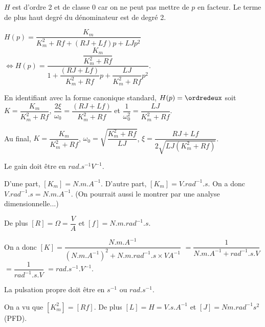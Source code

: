 \else
\fi

\ifprof
$H$ est d'ordre 2 et de classe 0 car on ne peut pas mettre de $p$ en facteur. Le terme de plus haut degré du dénominateur est de degré 2. 
\else
\fi

\ifprof
$H(p)=\dfrac{K_m}{K_m^2+ Rf +\left(RJ  + Lf\right) p + LJp^2 } $
$\Leftrightarrow H(p)=\dfrac{\dfrac{K_m}{K_m^2+ Rf}}{1 +\dfrac{\left(RJ  + Lf\right)}{K_m^2+ Rf} p + \dfrac{LJ}{K_m^2+ Rf}p^2 } $. 

\else
\fi




\ifprof
En identifiant avec la forme canonique standard, $H(p)=\ordredeux$ soit
$K = \dfrac{K_m}{K_m^2+ Rf}$, $\dfrac{2\xi}{\omega_0} = \dfrac{\left(RJ  + Lf\right)}{K_m^2+ Rf}$ et $\dfrac{1}{\omega_0^2}=\dfrac{LJ}{K_m^2+ Rf}$.


Au final,
$K = \dfrac{K_m}{K_m^2+ Rf}$,
$\omega_0=\sqrt{\dfrac{K_m^2+ Rf}{LJ}}$,
$\xi = \dfrac{RJ  + Lf}{2\sqrt{{LJ\left(K_m^2+ Rf\right)}}}$.
\else
\fi

\ifprof

Le gain doit être en $\si{rad.s^{-1}V^{-1}}$.

D'une part, $[K_m]=\si{N.m.A^{-1}}$. D'autre part, $[K_m]=\si{V.rad^{-1}.s}$. On a donc $\si{V.rad^{-1}.s}=\si{N.m.A^{-1}}$. (On pourrait aussi le montrer par une analyse dimensionnelle...)

De plus $[R]=\Omega = \dfrac{\si{V}}{\si{A}}$ et $[f]=\si{N.m.rad^{-1}.s}$.

On a donc 
$[K]=\dfrac{\si{N.m.A^{-1}}}
{(\si{N.m.A^{-1}})^2+\si{N.m.rad^{-1}.s}\times\si{VA^{-1}} }$
$=\dfrac{1}
{\si{N.m.A^{-1}}+\si{rad^{-1}.s.V} }$
$=\dfrac{1} {\si{rad^{-1}.s.V} }$
$= {\si{rad.s^{-1}.V^{-1}} }$. 

\vspace{.5cm}

La pulsation propre doit être en $\si{s^{-1}}$ ou $\si{rad.s^{-1}}$.

On a vu que $[K_m^2] = [Rf]$. De plus $[L] = H =  \si{V.s.A^{-1}}$ et 
$[J]=\si{Nm.rad^{-1}s^2}$ (PFD).

